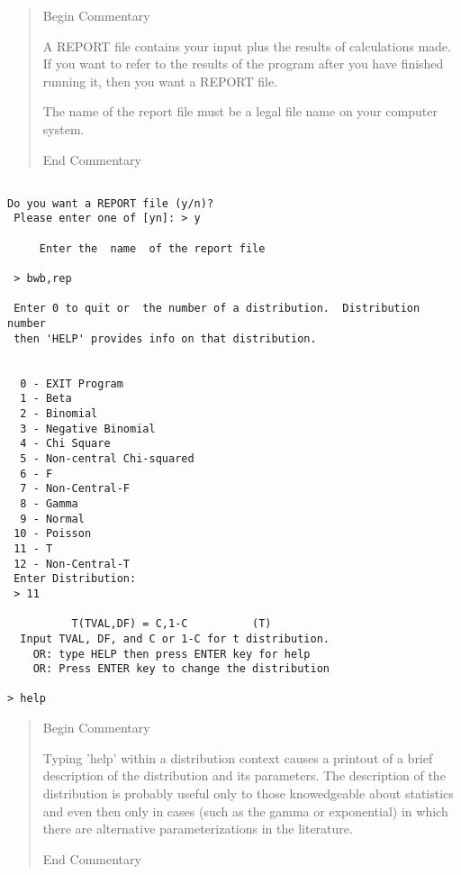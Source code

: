 \documentclass[12pt,dvips]{article}
\newenvironment{commentary}{\begin{quote} \color{Orange}
\begin{center} Begin Commentary\\ \vspace{0.1in} 
\end{center} \color{black} }
{\color{Orange} \begin{center} End Commentary\\ \end{center} \color{black}
      \end{quote} \normalsize }
\begin{document}
\begin{commentary}

A REPORT file contains your input plus the results of calculations
made.  If you want to refer to the results of the program after you
have finished running it, then you want a REPORT file.

The name of the report file must be a legal file name on your computer
system. 

\end{commentary}

\begin{verbatim}

Do you want a REPORT file (y/n)?
 Please enter one of [yn]: > y

     Enter the  name  of the report file

 > bwb,rep

 Enter 0 to quit or  the number of a distribution.  Distribution number
 then 'HELP' provides info on that distribution.


  0 - EXIT Program
  1 - Beta
  2 - Binomial
  3 - Negative Binomial
  4 - Chi Square
  5 - Non-central Chi-squared
  6 - F
  7 - Non-Central-F
  8 - Gamma
  9 - Normal
 10 - Poisson
 11 - T
 12 - Non-Central-T
 Enter Distribution:
 > 11

          T(TVAL,DF) = C,1-C          (T)
  Input TVAL, DF, and C or 1-C for t distribution.
    OR: type HELP then press ENTER key for help
    OR: Press ENTER key to change the distribution

> help

\end{verbatim}

\begin{commentary}

Typing   'help' within a distribution context causes a printout of
a brief description of the distribution and its parameters.  The 
description of the distribution is probably useful only to those
knowedgeable about statistics and even then only in cases (such as
the gamma or exponential) in which there are alternative
parameterizations
in the literature.

\end{commentary}
\end{document}
